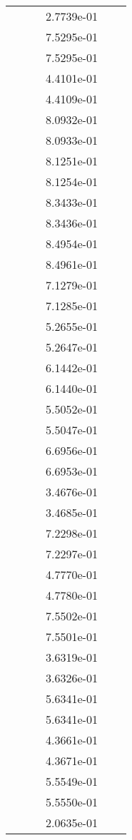 \begin{xltabular}{\textwidth}{r|rS[table-format=1.3e+2]S[table-format=1.4e+2]S[table-format=1.4e+2]S[table-format=-1.5]}
&  &  & 2.7739e-01 & & \\
&  &  & 7.5295e-01 & & \\
&  &  & 7.5295e-01 & & \\
&  &  & 4.4101e-01 & & \\
&  &  & 4.4109e-01 & & \\
&  &  & 8.0932e-01 & & \\
&  &  & 8.0933e-01 & & \\
&  &  & 8.1251e-01 & & \\
&  &  & 8.1254e-01 & & \\
&  &  & 8.3433e-01 & & \\
&  &  & 8.3436e-01 & & \\
&  &  & 8.4954e-01 & & \\
&  &  & 8.4961e-01 & & \\
&  &  & 7.1279e-01 & & \\
&  &  & 7.1285e-01 & & \\
&  &  & 5.2655e-01 & & \\
&  &  & 5.2647e-01 & & \\
&  &  & 6.1442e-01 & & \\
&  &  & 6.1440e-01 & & \\
&  &  & 5.5052e-01 & & \\
&  &  & 5.5047e-01 & & \\
&  &  & 6.6956e-01 & & \\
&  &  & 6.6953e-01 & & \\
&  &  & 3.4676e-01 & & \\
&  &  & 3.4685e-01 & & \\
&  &  & 7.2298e-01 & & \\
&  &  & 7.2297e-01 & & \\
&  &  & 4.7770e-01 & & \\
&  &  & 4.7780e-01 & & \\
&  &  & 7.5502e-01 & & \\
&  &  & 7.5501e-01 & & \\
&  &  & 3.6319e-01 & & \\
&  &  & 3.6326e-01 & & \\
&  &  & 5.6341e-01 & & \\
&  &  & 5.6341e-01 & & \\
&  &  & 4.3661e-01 & & \\
&  &  & 4.3671e-01 & & \\
&  &  & 5.5549e-01 & & \\
&  &  & 5.5550e-01 & & \\
&  &  & 2.0635e-01 & & \\

\end{xltabular}
